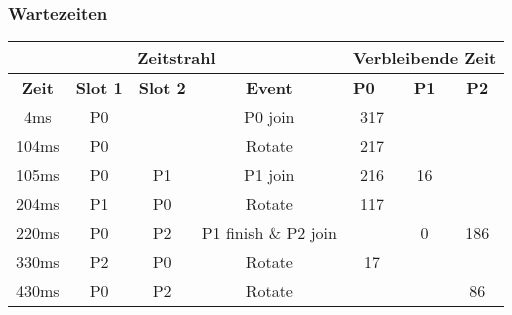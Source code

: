 \begin{frame}
    \frametitle{Wartezeiten}

    \begin{table}[]
        \begin{adjustbox}{width=0.8\textwidth}
            \begin{tabular}{c|ccc|ccc}
                \multicolumn{4}{c}{\textbf{Zeitstrahl}} & \multicolumn{3}{|c}{\textbf{Verbleibende Zeit}}                                                                                                        \\ \hline
                \textbf{Zeit}                           & \textbf{Slot 1}                                 & \textbf{Slot 2} & \textbf{Event}       & \multicolumn{1}{l}{\textbf{P0}} & \textbf{P1} & \textbf{P2} \\ \hline
                4ms                                     & P0                                              &                 & P0 join              & \alert{317}                     &             &             \\
                104ms                                   & P0                                              &                 & Rotate               & \alert{217}                     &             &             \\
                105ms                                   & P0                                              & P1              & P1 join              & \alert{216}                     & 16          &             \\
                204ms                                   & P1                                              & P0              & Rotate               & \alert{117}                     &             &             \\
                220ms                                   & P0                                              & P2              & P1 finish \& P2 join &                                 & \alert{0}   & 186         \\
                330ms                                   & P2                                              & P0              & Rotate               & \alert{17}                      &             &             \\
                430ms                                   & P0                                              & P2              & Rotate               &                                 &             & \alert{86}  \\

\end{tabular}
\end{adjustbox}
\end{table}
\end{frame}
